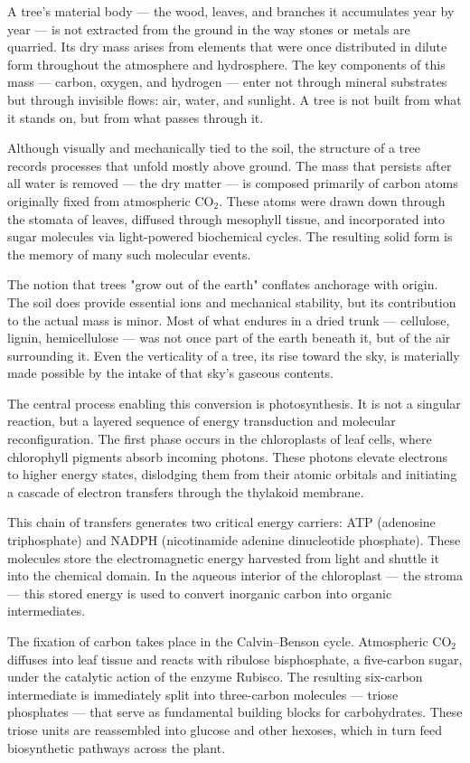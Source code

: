 A tree’s material body — the wood, leaves, and branches it accumulates year by year — is not extracted from the ground in the way stones or metals are quarried. Its dry mass arises from elements that were once distributed in dilute form throughout the atmosphere and hydrosphere. The key components of this mass — carbon, oxygen, and hydrogen — enter not through mineral substrates but through invisible flows: air, water, and sunlight. A tree is not built from what it stands on, but from what passes through it.

Although visually and mechanically tied to the soil, the structure of a tree records processes that unfold mostly above ground. The mass that persists after all water is removed — the dry matter — is composed primarily of carbon atoms originally fixed from atmospheric \(\mathrm{CO}_2\). These atoms were drawn down through the stomata of leaves, diffused through mesophyll tissue, and incorporated into sugar molecules via light-powered biochemical cycles. The resulting solid form is the memory of many such molecular events.

The notion that trees "grow out of the earth" conflates anchorage with origin. The soil does provide essential ions and mechanical stability, but its contribution to the actual mass is minor. Most of what endures in a dried trunk — cellulose, lignin, hemicellulose — was not once part of the earth beneath it, but of the air surrounding it. Even the verticality of a tree, its rise toward the sky, is materially made possible by the intake of that sky's gaseous contents.

The central process enabling this conversion is photosynthesis. It is not a singular reaction, but a layered sequence of energy transduction and molecular reconfiguration. The first phase occurs in the chloroplasts of leaf cells, where chlorophyll pigments absorb incoming photons. These photons elevate electrons to higher energy states, dislodging them from their atomic orbitals and initiating a cascade of electron transfers through the thylakoid membrane.

This chain of transfers generates two critical energy carriers: ATP (adenosine triphosphate) and NADPH (nicotinamide adenine dinucleotide phosphate). These molecules store the electromagnetic energy harvested from light and shuttle it into the chemical domain. In the aqueous interior of the chloroplast — the stroma — this stored energy is used to convert inorganic carbon into organic intermediates.

The fixation of carbon takes place in the Calvin–Benson cycle. Atmospheric \(\mathrm{CO}_2\) diffuses into leaf tissue and reacts with ribulose bisphosphate, a five-carbon sugar, under the catalytic action of the enzyme Rubisco. The resulting six-carbon intermediate is immediately split into three-carbon molecules — triose phosphates — that serve as fundamental building blocks for carbohydrates. These triose units are reassembled into glucose and other hexoses, which in turn feed biosynthetic pathways across the plant.

